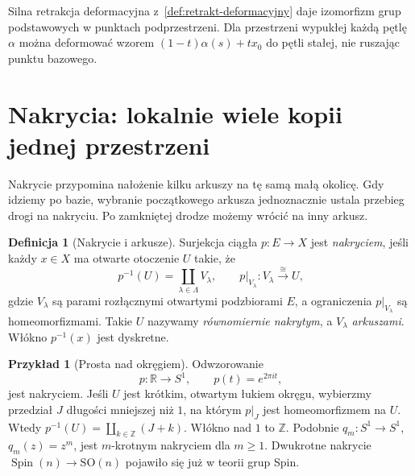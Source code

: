 \documentclass[11pt,a4paper,oneside]{report}
\newcommand{\R}{\mathbb{R}}
\newcommand{\Z}{\mathbb{Z}}
\theoremstyle{plain}
\theoremstyle{definition}
\newtheorem{definicja}[twierdzenie]{Definicja}
\newtheorem{przyklad}[twierdzenie]{Przykład}
\theoremstyle{remark}
\begin{document}
Silna retrakcja deformacyjna
z~\ref{def:retrakt-deformacyjny} daje
izomorfizm grup podstawowych w punktach
podprzestrzeni. Dla przestrzeni wypukłej
każdą pętlę $\alpha$ można deformować
wzorem $(1-t)\alpha(s)+tx_0$ do pętli
stałej, nie ruszając punktu bazowego.

\section{Nakrycia: lokalnie wiele kopii jednej przestrzeni}
\label{sec:nakrycia}

Nakrycie przypomina nałożenie kilku arkuszy
na tę samą małą okolicę. Gdy idziemy po bazie,
wybranie początkowego arkusza jednoznacznie
ustala przebieg drogi na nakryciu.
Po zamkniętej drodze możemy wrócić na inny arkusz.

\begin{definicja}[Nakrycie i arkusze]
\label{def:nakrycie}
Surjekcja ciągła $p:E\to X$ jest \emph{nakryciem},
jeśli każdy $x\in X$ ma otwarte otoczenie $U$
takie, że
\[
 p^{-1}(U)=\coprod_{\lambda\in\Lambda}V_\lambda,
 \qquad
 p|_{V_\lambda}:V_\lambda\xrightarrow{\cong}U,
\]
gdzie $V_\lambda$ są parami rozłącznymi
otwartymi podzbiorami $E$, a ograniczenia $p|_{V_\lambda}$
są homeomorfizmami.
Takie $U$ nazywamy \emph{równomiernie nakrytym},
a $V_\lambda$ \emph{arkuszami}.
Włókno $p^{-1}(x)$ jest dyskretne.
\end{definicja}

\begin{przyklad}[Prosta nad okręgiem]
\label{prz:exp-nakrycie}
Odwzorowanie
\[
 p:\R\to S^1,\qquad p(t)=e^{2\pi i t},
\]
jest nakryciem. Jeśli $U$ jest krótkim,
otwartym łukiem okręgu, wybierzmy przedział
$J$ długości mniejszej niż $1$, na którym
$p|_J$ jest homeomorfizmem na $U$.
Wtedy $p^{-1}(U)=\coprod_{k\in\Z}(J+k)$.
Włókno nad $1$ to $\Z$.
Podobnie $q_m:S^1\to S^1$, $q_m(z)=z^m$,
jest $m$-krotnym nakryciem dla $m\geq1$.
Dwukrotne nakrycie $\operatorname{Spin}(n)
\to\mathrm{SO}(n)$ pojawiło się już w teorii grup Spin.
\end{przyklad}
\end{document}
